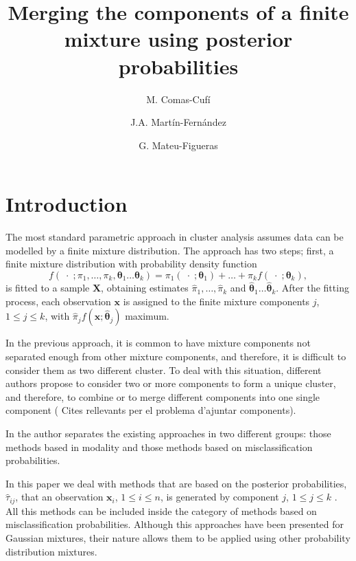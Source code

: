 \documentclass[10pt, a4paper]{article}
\title{Merging the components of a finite mixture using  posterior probabilities}
\author{M. Comas-Cufí \and J.A. Martín-Fernández \and G. Mateu-Figueras}
\newcommand{\m}[1]{\boldsymbol{#1}}
\begin{document}
\maketitle

\section{Introduction}

The most standard parametric approach in cluster analysis assumes data can be modelled by a finite mixture distribution. The approach has two steps; first, a finite mixture distribution with probability density function
\[
f(\;\cdot\; ; \pi_1, \dots, \pi_k, \m\theta_1 \dots \m\theta_k) = \pi_1   (\;\cdot\; ; \m\theta_1) + \dots + \pi_k f(\;\cdot\; ; \m\theta_k),
\]%
is fitted to a sample $\m X$, obtaining estimates $\hat{\pi}_1, \dots, \hat{\pi}_k$ and $\hat{\m\theta}_1 \dots \hat{\m\theta}_k$. After the fitting process, each observation $\m x$ is assigned to the finite mixture components $j$, $1\leq j \leq k$, with $\hat{\pi}_j f(\m x ; \hat{\m\theta}_j)$ maximum. 

In the previous approach, it is common to have mixture components not separated enough from other mixture components, and therefore, it is difficult to consider them as two different cluster. To deal with this situation, different authors propose to consider two or more components to form a unique cluster, and therefore, to combine or to merge different components into one single component ({\color{red} Cites rellevants per el problema d'ajuntar components}).

In \cite{hennig2010methods} the author separates the existing approaches in two different groups: those methods based in modality and those methods based on misclassification probabilities. 

In this paper we deal with methods that are based on the posterior probabilities, $\hat{\tau}_{ij}$, that an observation $\m x_i$, $1\leq i \leq n$, is generated by component $j$, $1\leq j\leq k$ \citep{longford2014,melnykov2013distribution,hennig2010methods,baudry2010combining}. All this methods can be included inside the category of methods based on misclassification probabilities. Although this approaches have been presented for Gaussian mixtures, their nature allows them to be applied using other probability distribution mixtures.


\end{document}
